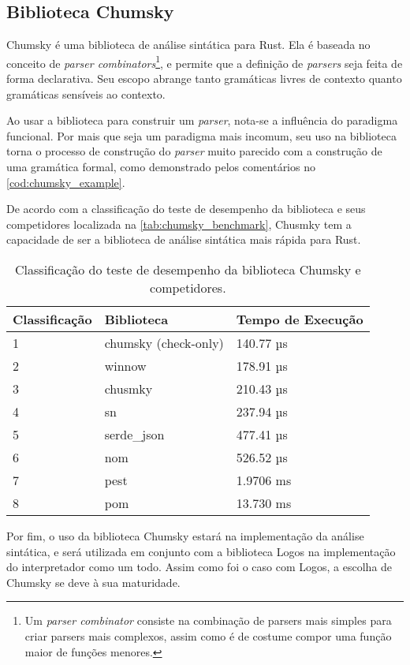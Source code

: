 \subsection{Biblioteca Chumsky}

Chumsky é uma biblioteca de análise sintática para Rust. Ela é baseada no conceito de \textit{parser combinators}\footnote{Um \textit{parser combinator} consiste na combinação de parsers mais simples para criar parsers mais complexos, assim como é de costume compor uma função maior de funções menores.}, e permite que a definição de \textit{parsers} seja feita de forma declarativa. Seu escopo abrange tanto gramáticas livres de contexto quanto gramáticas sensíveis ao contexto.

Ao usar a biblioteca para construir um \textit{parser}, nota-se a influência do paradigma funcional. Por mais que seja um paradigma mais incomum, seu uso na biblioteca torna o processo de construção do \textit{parser} muito parecido com a construção de uma gramática formal, como demonstrado pelos comentários no \autoref{cod:chumsky_example}.

\codigoRust

\vspace{-1em}

De acordo com a classificação do teste de desempenho da biblioteca e seus competidores localizada na \autoref{tab:chumsky_benchmark}, Chusmky tem a capacidade de ser a biblioteca de análise sintática mais rápida para Rust.

\FloatBarrier

\begin{table}[H]
	\centering
	\caption{Classificação do teste de desempenho da biblioteca Chumsky e competidores.}
	{
		\begin{tabular}{lll}
			\hline
			\textbf{Classificação} & \textbf{Biblioteca}      & \textbf{Tempo de Execução} \\ \hline
			1                      & chumsky (check-only) & 140.77 µs                  \\
			2                      & winnow               & 178.91 µs                  \\
			3                      & chusmky              & 210.43 µs                  \\
			4                      & sn                   & 237.94 µs                  \\
			5                      & serde\_json          & 477.41 µs                  \\
			6                      & nom                  & 526.52 µs                  \\
			7                      & pest                 & 1.9706 ms                  \\
			8                      & pom                  & 13.730 ms                  \\ \hline
		\end{tabular}
	}
	\label{tab:chumsky_benchmark}
\end{table}

Por fim, o uso da biblioteca Chumsky estará na implementação da análise sintática, e será utilizada em conjunto com a biblioteca Logos na implementação do interpretador como um todo. Assim como foi o caso com Logos, a escolha de Chumsky se deve à sua maturidade.
